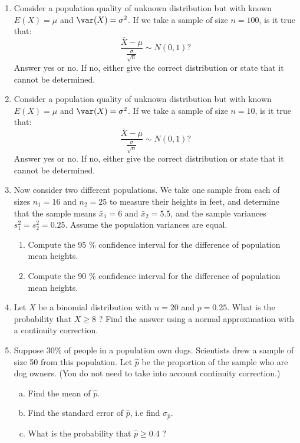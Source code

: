 \begin{enumerate}[Q 1.]
\vspace{35mm}
\item Consider a population quality of unknown distribution but with known $E(X) = \mu$ and $\var(X) = \sigma^2$. If we take a sample of size $n = 100$, is it true that: 
\[ \frac{\overline{X} - \mu}{\frac{\sigma}{\sqrt{n}}} \sim N(0,1)? \]
Answer yes or no. If no, either give the correct distribution or state that it cannot be determined.\\

\vspace{35mm}
\item Consider a population quality of unknown distribution but with known $E(X) = \mu$ and $\var(X) = \sigma^2$. If we take a sample of size $n = 10$, is it true that: 
\[ \frac{\overline{X} - \mu}{\frac{\sigma}{\sqrt{n}}} \sim N(0,1)? \]
Answer yes or no. If no, either give the correct distribution or state that it cannot be determined.\\

\vspace{35mm}
\item Now consider two different populations. We take one sample from each of sizes $n_1 = 16$ and $n_2 = 25$ to measure their heights in feet, and determine that the sample means $\bar{x}_1 = 6$ and $\bar{x}_2 = 5.5$, and the sample variances $s_1^2 = s_2^2 = 0.25$. Assume the population variances are equal.
	\begin{enumerate}
	\item Compute the 95 \% confidence interval for the difference of population mean heights.
	\item Compute the 90 \% confidence interval for the difference of population mean heights.
	\end{enumerate}

\vspace{35mm}
\item Let $X$ be a binomial distribution with $n=20$ and $p=0.25$. What is the probability that $X \geq 8$ ? Find the answer using a normal approximation with a continuity correction. 

\vspace{35mm}
\item Suppose 30\% of people in a population own dogs. Scientists drew a sample of size 50 from this population. Let $\hat{p}$ be the proportion of the sample who are dog owners. (You do not need to take into account continuity correction.)
\begin{enumerate}[(a)]
\item Find the mean of $\hat{p}$.
\item Find the standard error of $\hat{p}$, i.e find $\sigma_{\hat{p}}$.
\item What is the probability that $\hat{p} \geq 0.4$ ?
\end{enumerate}

\vspace{35mm}

\end{enumerate} 
